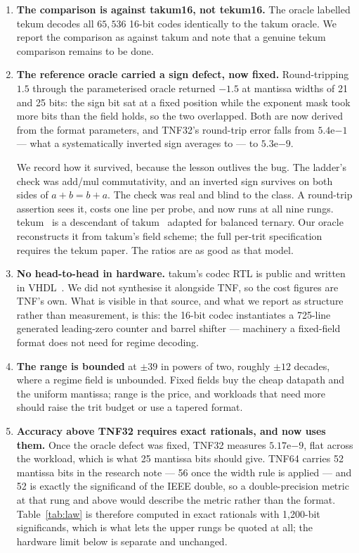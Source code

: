 \documentclass[11pt]{article}
\theoremstyle{definition}
\begin{document}
\begin{enumerate}[leftmargin=*]
\item \textbf{The comparison is against takum16, not tekum16.} The oracle
labelled tekum decodes all $65{,}536$ 16-bit codes identically to the takum
oracle. We report the comparison as against takum and note that a genuine tekum
comparison remains to be done.

\item \textbf{The reference oracle carried a sign defect, now fixed.} Round-tripping
$1.5$ through the parameterised oracle returned $-1.5$ at mantissa widths of 21
and 25 bits: the sign bit sat at a fixed position while the exponent mask took
more bits than the field holds, so the two overlapped. Both are now derived from
the format parameters, and TNF32's round-trip error falls from
$5.4\mathrm{e}{-1}$ --- what a systematically inverted sign averages to --- to
$5.3\mathrm{e}{-9}$.

We record how it survived, because the lesson outlives the bug. The ladder's
check was add/mul commutativity, and an inverted sign survives on both sides of
$a+b=b+a$. The check was real and blind to the class. A round-trip assertion sees
it, costs one line per probe, and now runs at all nine rungs. tekum~\cite{tekum} is a descendant of takum~\cite{takum} adapted for balanced
ternary. Our
oracle reconstructs it from takum's field scheme; the full per-trit
specification requires the tekum paper. The ratios are as good as that model.

\item \textbf{No head-to-head in hardware.} takum's codec RTL is public and
written in VHDL~\cite{takumrtl}. We did not synthesise it alongside TNF, so the cost figures are
TNF's own. What is visible in that source, and what we report as structure
rather than measurement, is this: the 16-bit codec instantiates a 725-line
generated leading-zero counter and barrel shifter --- machinery a fixed-field
format does not need for regime decoding.

\item \textbf{The range is bounded} at $\pm39$ in powers of two, roughly $\pm12$
decades, where a regime field is unbounded. Fixed fields buy the cheap datapath
and the uniform mantissa; range is the price, and workloads that need more should
raise the trit budget or use a tapered format.

\item \textbf{Accuracy above TNF32 requires exact rationals, and now uses them.}
Once the oracle defect was fixed, TNF32 measures $5.17\mathrm{e}{-9}$, flat
across the workload, which is what 25 mantissa bits should give. TNF64 carries
52 mantissa bits in the research note --- 56 once the width rule is applied ---
and 52 is exactly the significand of the IEEE double, so a double-precision
metric at that rung and above would describe the metric rather than the format.
Table~\ref{tab:law} is therefore computed in exact rationals with 1{,}200-bit
significands, which is what lets the upper rungs be quoted at all; the hardware
limit below is separate and unchanged.


\end{enumerate}
\end{document}
